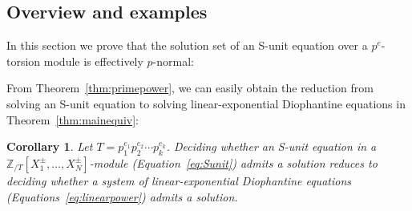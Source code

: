 \documentclass[letterpaper, 11pt, thm-restate]{article}
\numberwithin{equation}{section}
\newcommand{\ZT}{\mathbb{Z}_{/T}}
\newtheorem{cor}[thrm]{Corollary}
\theoremstyle{definition}
\theoremstyle{definition}
\theoremstyle{definition}
\begin{document}
\subsection{Overview and examples}

In this section we prove that the solution set of an S-unit equation over a $p^e$-torsion module is effectively $p$-normal:

\thmprimepower*

From Theorem~\ref{thm:primepower}, we can easily obtain the reduction from solving an S-unit equation to solving linear-exponential Diophantine equations in Theorem~\ref{thm:mainequiv}:

\begin{cor}\label{cor:intersection}
    Let $T = p_1^{e_1} p_2^{e_2} \cdots p_k^{e_k}$.
    Deciding whether an S-unit equation in a $\ZT[X_1^{\pm}, \ldots, X_N^{\pm}]$-module (Equation~\eqref{eq:Sunit}) admits a solution reduces to deciding whether a system of linear-exponential Diophantine equations (Equations~\eqref{eq:linearpower}) admits a solution.
\end{cor}
\end{document}
